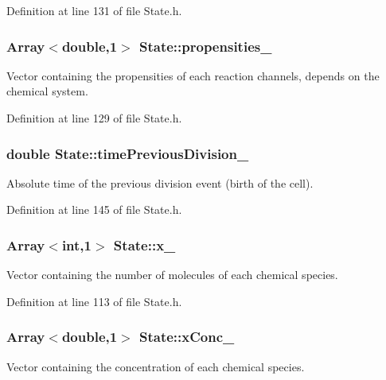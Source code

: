 \-Definition at line 131 of file \-State.\-h.

\hypertarget{class_state_a5e1c561cb95ed83f9a91dd3faa19f7bb}{
\subsubsection[{propensities\-\_\-}]{\setlength{\rightskip}{0pt plus 5cm}\-Array$<$double,1$>$ {\bf \-State\-::propensities\-\_\-}}}\label{class_state_a5e1c561cb95ed83f9a91dd3faa19f7bb}
\-Vector containing the propensities of each reaction channels, depends on the chemical system. 

\-Definition at line 129 of file \-State.\-h.

\hypertarget{class_state_accaf47f10a98b8f358865c227cf7ee81}{
\subsubsection[{time\-Previous\-Division\-\_\-}]{\setlength{\rightskip}{0pt plus 5cm}double {\bf \-State\-::time\-Previous\-Division\-\_\-}}}\label{class_state_accaf47f10a98b8f358865c227cf7ee81}
\-Absolute time of the previous division event (birth of the cell). 

\-Definition at line 145 of file \-State.\-h.

\hypertarget{class_state_a283b1ba6e0c44e73351cfbc23c5f6208}{
\subsubsection[{x\-\_\-}]{\setlength{\rightskip}{0pt plus 5cm}\-Array$<$int,1$>$ {\bf \-State\-::x\-\_\-}}}\label{class_state_a283b1ba6e0c44e73351cfbc23c5f6208}
\-Vector containing the number of molecules of each chemical species. 

\-Definition at line 113 of file \-State.\-h.

\hypertarget{class_state_ae9d97b07af3961c3dea57bc6d18fcaf1}{
\subsubsection[{x\-Conc\-\_\-}]{\setlength{\rightskip}{0pt plus 5cm}\-Array$<$double,1$>$ {\bf \-State\-::x\-Conc\-\_\-}}}\label{class_state_ae9d97b07af3961c3dea57bc6d18fcaf1}
\-Vector containing the concentration of each chemical species. 

